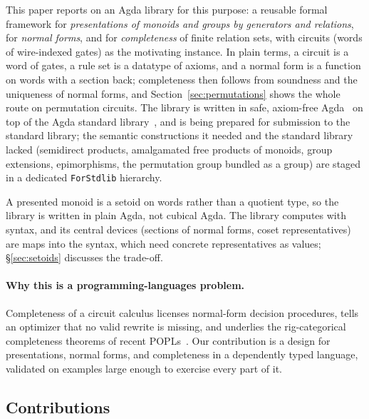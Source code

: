 This paper reports on an Agda library for this purpose: a
reusable formal framework for \emph{presentations of monoids and
groups by generators and relations}, for \emph{normal forms}, and for
\emph{completeness} of finite relation sets, with circuits (words of
wire-indexed gates) as the motivating instance.  In plain terms, a circuit
is a word of gates, a rule set is a datatype of axioms, and a normal form
is a function on words with a section back; completeness then follows
from soundness and the uniqueness of normal forms, and
Section~\ref{sec:permutations} shows the whole route on permutation
circuits.  The library is written in
safe, axiom-free Agda~\cite{norell2007thesis,bove2009agda} on top of the
Agda standard library~\cite{daggitt2025stdlib,agdastdlib}, and is being
prepared for submission to the standard library; the semantic constructions it needed and
the standard library lacked (semidirect products, amalgamated free products
of monoids, group extensions, epimorphisms, the permutation group bundled as
a group) are staged in a dedicated \texttt{ForStdlib} hierarchy.

A presented monoid is a setoid on words rather than a quotient type, so
the library is written in plain Agda, not cubical Agda.  The library
computes with syntax, and its central devices (sections of normal forms,
coset representatives) are maps into the syntax, which need
concrete representatives as values; \S\ref{sec:setoids} discusses the
trade-off.

\paragraph{Why this is a programming-languages problem.}
Completeness of a circuit calculus licenses normal-form decision
procedures, tells an optimizer that no valid rewrite is missing, and
underlies the rig-categorical completeness theorems of recent
POPLs~\cite{choudhury2022symmetries,carette2024squareroots,fang2026hadamard}.
Our contribution is a design for presentations, normal forms, and
completeness in a dependently typed language, validated on examples
large enough to exercise every part of it.

\subsection{Contributions}\label{sec:contributions}

